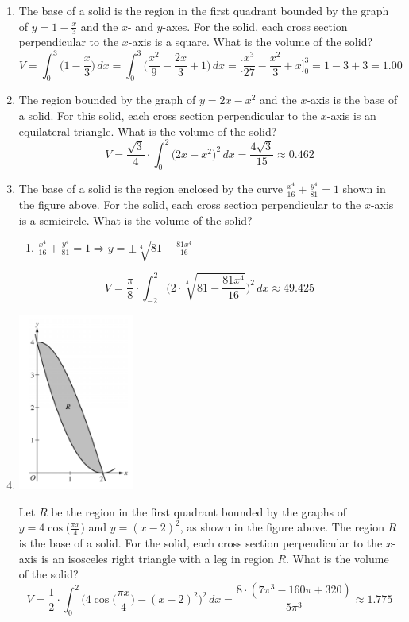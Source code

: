 \documentclass[12pt]{article}
\begin{document}
\begin{enumerate}
    \item The base of a solid is the region in the first quadrant bounded by the graph of $y=1-\frac{x}{3}$ and the $x$- and $y$-axes. For the solid, each cross section perpendicular to the $x$-axis is a square. What is the volume of the solid?
    $$V=\int_{0}^{3} \biggr( 1-\frac{x}{3}\biggr) \, dx = \int_{0}^{3} \biggr( \frac{x^2}{9} - \frac{2x}{3} + 1\biggr) \, dx = \biggr[\frac{x^3}{27}-\frac{x^2}{3}+x\biggr]_{0}^{3} = 1-3+3 =\boxed{1.00}$$

    \item The region bounded by the graph of $y=2x-x^2$ and the $x$-axis is the base of a solid. For this solid, each cross section perpendicular to the $x$-axis is an equilateral triangle. What is the volume of the solid?
    $$V=\frac{\sqrt{3}}{4} \cdot \int_{0}^{2} \biggr( 2x-x^2\biggr)^2 \, dx = \frac{4\sqrt{3}}{15}\approx \boxed{0.462}$$

    \item The base of a solid is the region enclosed by the curve $\frac{x^4}{16}+\frac{y^4}{81}=1$ shown in the figure above. For the solid, each cross section perpendicular to the $x$-axis is a semicircle. What is the volume of the solid?
    \begin{enumerate}
        \item $\frac{x^4}{16}+\frac{y^4}{81}=1 \Longrightarrow y=\pm \sqrt[4]{81-\frac{81x^4}{16}}$
    \end{enumerate}
    $$V=\frac{\pi}{8}\cdot \int_{-2}^{2} \Biggr( 2 \cdot \sqrt[4]{81-\frac{81x^4}{16}}\Biggr)^2 \, dx \approx\boxed{49.425} $$
\newpage
    \item 
    \begin{center}
        \includegraphics[width=1.5in]{original-27.png}
    \end{center}
    Let $R$ be the region in the first quadrant bounded by the graphs of $y=4\cos \big(\frac{\pi x}{4}\big)$ and $y=(x-2)^2$, as shown in the figure above. The region $R$ is the base of a solid. For the solid, each cross section perpendicular to the $x$-axis is an isosceles right triangle with a leg in region $R$. What is the volume of the solid?
    $$V=\frac{1}{2}\cdot \int_{0}^{2} \biggr(4\cos \biggr(\frac{\pi x}{4}\biggr)- (x-2)^2\biggr)^2 \, dx =\frac{8\cdot (7\pi^3-160\pi +320)}{5\pi^3} \approx \boxed{1.775}$$


\end{enumerate}
\end{document}
